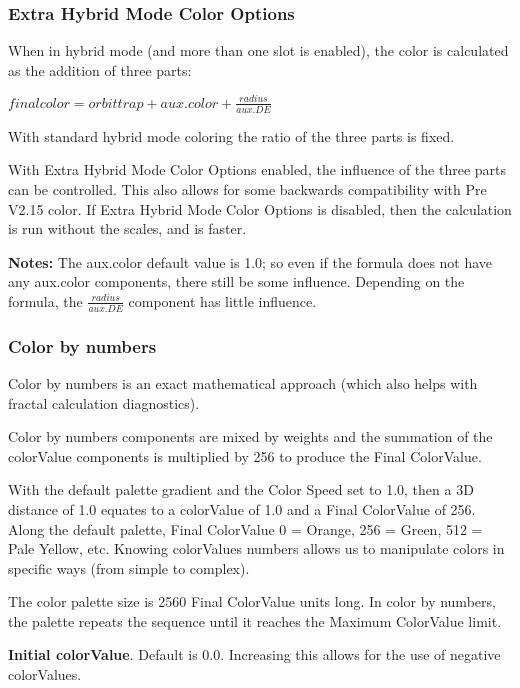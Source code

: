 \subsubsection{Extra Hybrid Mode Color Options}\label{materials-extra-hybrid-mode-color-options}

When in hybrid mode (and more than one slot is enabled), the color is calculated as the addition of three parts:

\(final color = orbit trap  +  aux.color  +  \frac{radius}{aux.DE}\)

With standard hybrid mode coloring the ratio of the three parts is fixed.

With Extra Hybrid Mode Color Options enabled, the influence of the three parts can be controlled. This also allows for some backwards compatibility with Pre V2.15 color. If Extra Hybrid Mode Color Options is disabled, then the calculation is run without the scales, and is faster.

\textbf{Notes: }The aux.color default value is 1.0; so even if the formula does not have any aux.color components, there still be some influence. Depending on the formula, the \(\frac{radius}{aux.DE}\) component has little influence.

\subsubsection{Color by numbers}\label{materials-color-by-numbers}

Color by numbers is an exact mathematical approach (which also helps with fractal calculation diagnostics).

Color by numbers components are mixed by weights and the summation of the colorValue components is multiplied by 256 to produce the Final ColorValue.

With the default palette gradient and the Color Speed set to 1.0, then a 3D distance of 1.0 equates to a colorValue of 1.0 and a Final ColorValue of 256. Along the default palette, Final ColorValue 0 = Orange, 256 = Green, 512 = Pale Yellow, etc.
Knowing colorValues numbers allows us to manipulate colors in specific ways (from simple to complex).

The color palette size is 2560 Final ColorValue units long. In color by numbers, the palette repeats the sequence until it reaches the Maximum ColorValue limit.

\textbf{Initial colorValue}. Default is 0.0. Increasing this allows for the use of negative colorValues.

